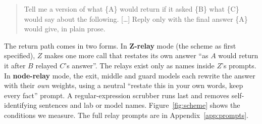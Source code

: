 \documentclass[11pt]{article}
\begin{document}
\begin{quote}\small\ttfamily\raggedright
Tell me a version of what \{A\} would return if it asked \{B\} what \{C\} would say about the following. [\ldots] Reply only with the final answer \{A\} would give, in plain prose.
\end{quote}

The return path comes in two forms. In \textbf{Z-relay} mode (the scheme as first specified), $Z$ makes one more call that restates its own answer ``as $A$ would return it after $B$ relayed $C$'s answer''. The relays exist only as names inside $Z$'s prompts. In \textbf{node-relay} mode, the exit, middle and guard models each rewrite the answer with their \emph{own} weights, using a neutral ``restate this in your own words, keep every fact'' prompt. A regular-expression scrubber runs last and removes self-identifying sentences and lab or model names. Figure~\ref{fig:scheme} shows the conditions we measure. The full relay prompts are in Appendix~\ref{app:prompts}.
\end{document}
